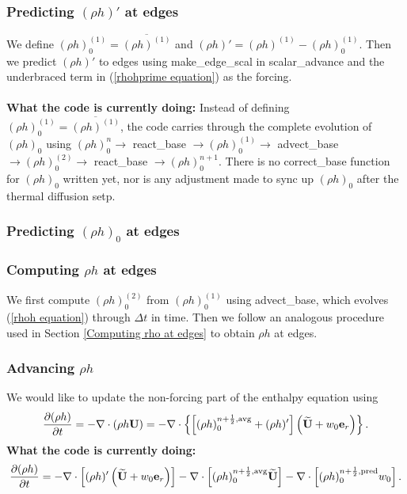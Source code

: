 \documentclass[11pt]{article}
\def\half  {\frac{1}{2}}
\def\eb    {{\bf e}}
\def\Ub    {{\bf U}}
\def\Ubt   {\widetilde{\bf U}}
\begin{document}
\subsubsection{Predicting $(\rho h)'$ at edges}\label{Predicting rhohprime at edges}
We define $(\rho h)_0^{(1)} = \overline{(\rho h)^{(1)}}$  and 
$(\rho h)' = (\rho h)^{(1)}-(\rho h)_0^{(1)}$.  Then we predict $(\rho h)'$ to 
edges using make\_edge\_scal in scalar\_advance and the underbraced term in 
(\ref{rhohprime equation}) as the forcing.\\ \\
{\bf What the code is currently doing:} Instead of defining 
$(\rho h)_0^{(1)} = \overline{(\rho h)^{(1)}}$, the code carries through the complete 
evolution of $(\rho h)_0$ using $(\rho h)_0^n \rightarrow$ react\_base 
$\rightarrow (\rho h)_0^{(1)} \rightarrow$ advect\_base 
$\rightarrow (\rho h)_0^{(2)} \rightarrow$ react\_base $\rightarrow (\rho h)_0^{n+1}$.  
There is no correct\_base function for $(\rho h)_0$ written yet, nor is any adjustment made 
to sync up $(\rho h)_0$ after the thermal diffusion setp.
\subsubsection{Predicting $(\rho h)_0$ at edges}
\subsubsection{Computing $\rho h$ at edges}
We first compute $(\rho h)_0^{(2)}$ from $(\rho h)_0^{(1)}$ using advect\_base, which evolves 
(\ref{rhoh equation}) through $\Delta t$ in time.  Then we follow an analogous procedure 
used in Section \ref{Computing rho at edges} to obtain $\rho h$ at edges.
\subsubsection{Advancing $\rho h$}
We would like to update the non-forcing part of the enthalpy equation using
\begin{equation}
\frac{\partial(\rho h)}{\partial t} = -\nabla\cdot(\rho h\Ub) = -\nabla\cdot\left\{\left[(\rho h)_0^{n+\half,{\rm avg}}+(\rho h)'\right]\left(\Ubt + w_0\eb_r\right)\right\}.
\end{equation}
{\bf What the code is currently doing:}
\begin{equation}
\frac{\partial(\rho h)}{\partial t} = -\nabla\cdot\left[(\rho h)'\left(\Ubt + w_0\eb_r\right)\right] - \nabla\cdot\left[(\rho h)_0^{n+\half,{\rm avg}}\Ubt\right] - \nabla\cdot\left[(\rho h)_0^{n+\half,{\rm pred}}w_0\right].
\end{equation}
\end{document}
